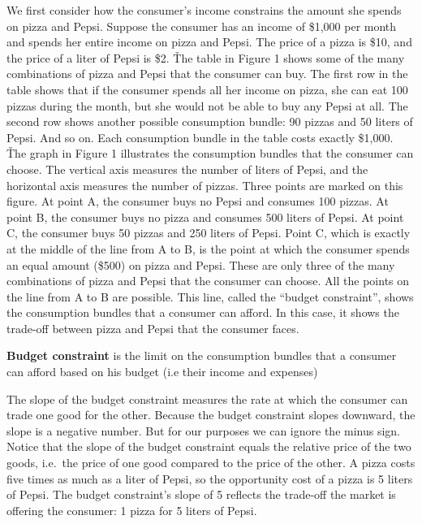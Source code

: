 We first consider how the consumer's income constrains the amount she spends on pizza and Pepsi. Suppose the consumer
has an income of \$1,000 per month and spends her entire income on pizza and Pepsi. The price of a pizza is \$10, and
the price of a liter of Pepsi is \$2. \v

The table in Figure 1 shows some of the many combinations of pizza and Pepsi that the consumer can buy. The first row
in the table shows that if the consumer spends all her income on pizza, she can eat 100 pizzas during the month, but
she would not be able to buy any Pepsi at all. The second row shows another possible consumption bundle: 90 pizzas
and 50 liters of Pepsi. And so on. Each consumption bundle in the table costs exactly \$1,000. \v

The graph in Figure 1 illustrates the consumption bundles that the consumer can choose. The vertical axis measures
the number of liters of Pepsi, and the horizontal axis measures the number of pizzas. Three points are marked on this
figure. At point A, the consumer buys no Pepsi and consumes 100 pizzas. At point B, the consumer buys no pizza and
consumes 500 liters of Pepsi. At point C, the consumer buys 50 pizzas and 250 liters of Pepsi. Point C, which is
exactly at the middle of the line from A to B, is the point at which the consumer spends an equal amount (\$500) on
pizza and Pepsi. These are only three of the many combinations of pizza and Pepsi that the consumer can choose. All
the points on the line from A to B are possible. This line, called the ``budget constraint'', shows the consumption
bundles that a consumer can afford. In this case, it shows the trade-off between pizza and Pepsi that the consumer
faces.


\textbf{Budget constraint} is the limit on the consumption bundles that a consumer can afford based on his budget (i.e
their income and expenses)
\ed

The slope of the budget constraint measures the rate at which the consumer can trade one good for the other. Because
the budget constraint slopes downward, the slope is a negative number. But for our purposes we can ignore the minus
sign. Notice that the slope of the budget constraint equals the relative price of the two goods, i.e.\ the price of one
good compared to the price of the other. A pizza costs five times as much as a liter of Pepsi, so the opportunity
cost of a pizza is 5 liters of Pepsi. The budget constraint's slope of 5 reflects the trade-off the market is
offering the consumer: 1 pizza for 5 liters of Pepsi.

